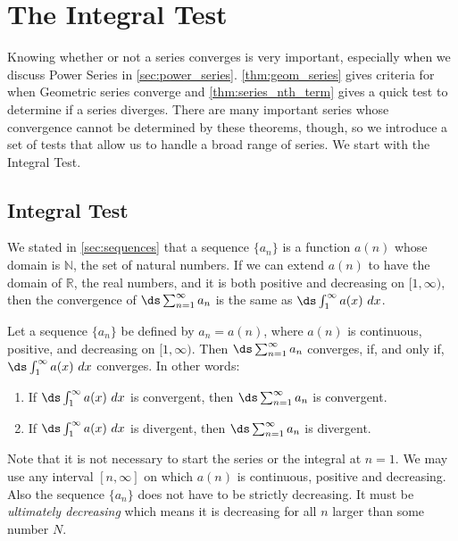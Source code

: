 \section{The Integral Test}\label{sec:int_tests}

Knowing whether or not a series converges is very important, especially when we discuss Power Series in \autoref{sec:power_series}. \autoref{thm:geom_series} gives criteria for when Geometric series converge and \autoref{thm:series_nth_term} gives a quick test to determine if a series diverges. There are many important series whose convergence cannot be determined by these theorems, though, so we introduce a set of tests that allow us to handle a broad range of series. We start with the Integral Test.


\subsection{Integral Test}

We stated in \autoref{sec:sequences} that a sequence $\{a_n\}$ is a function $a(n)$ whose domain is $\mathbb{N}$, the set of natural numbers. If we can extend $a(n)$ to have the domain of $\mathbb{R}$, the real numbers, and it is both positive and decreasing on $[1,\infty)$, then the convergence of $\ds \sum_{n=1}^\infty a_n$ is the same as $\ds\int_1^\infty a(x)\ dx$. 

\begin{theorem}\label{thm:integral_test}
Let a sequence $\{a_n\}$ be defined by $a_n=a(n)$, where $a(n)$ is continuous, positive, and decreasing on $[1,\infty)$. Then $\ds \sum_{n=1}^\infty a_n$ converges, if, and only if, $\ds\int_1^\infty a(x)\ dx$ converges. In other words:
\begin{enumerate}
\item If $\ds \int_1^\infty a(x)\ dx$ is convergent, then $\ds \sum_{n=1}^\infty a_n$ is convergent.
\item If $\ds \int_1^\infty a(x)\ dx$ is divergent, then $\ds \sum_{n=1}^\infty a_n$ is divergent.
\end{enumerate}
\end{theorem}


Note that it is not necessary to start the series or the integral at $n=1$. We may use any interval $[n,\infty]$ on which $a(n)$ is continuous, positive and decreasing. Also the sequence $\{a_n\}$ does not have to be strictly decreasing. It must be \textit{ultimately decreasing} which means it is decreasing for all $n$ larger than some number $N$.\bigskip



